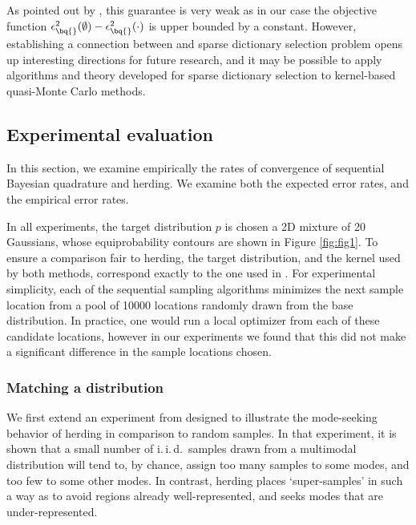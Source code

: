 As pointed out by \citet{KrauseCevher10}, this guarantee is very weak as in our case the objective function $\epsilon^{2}_{\bq{}}(\emptyset)-\epsilon^{2}_{\bq{}}(\cdot)$ is upper bounded by a constant. However, establishing a connection between \sbq{} and sparse dictionary selection problem opens up interesting directions for future research, and it may be possible to apply algorithms and theory developed for sparse dictionary selection to kernel-based quasi-Monte Carlo methods.

\subsection{Experimental evaluation}
\label{sec:experiments}

In this section, we examine empirically the rates of convergence of sequential Bayesian quadrature and herding.  We examine both the expected error rates, and the empirical error rates.

In all experiments, the target distribution $p$ is chosen a 2D mixture of 20 Gaussians, whose equiprobability contours are shown in Figure \ref{fig:fig1}. To ensure a comparison fair to herding, the target distribution, and the kernel used by both methods, correspond exactly to the one used in \citep[Fig. 1]{chen2010super}. %
%
For experimental simplicity, each of the sequential sampling algorithms minimizes the next sample location from a pool of 10000 locations randomly drawn from the base distribution. In practice, one would run a local optimizer from each of these candidate locations, however in our experiments we found that this did not make a significant difference in the sample locations chosen. 

\subsubsection{Matching a distribution}

We first extend an experiment from \citep{chen2010super} designed to illustrate the mode-seeking behavior of herding in comparison to random samples. In that experiment, %
it is shown that a small number of i.\,i.\,d.\ samples drawn from a multimodal distribution will tend to, by chance, assign too many samples to some modes, and too few to some other modes. In contrast, herding places `super-samples' in such a way as to avoid regions already well-represented, and seeks modes that are under-represented.

